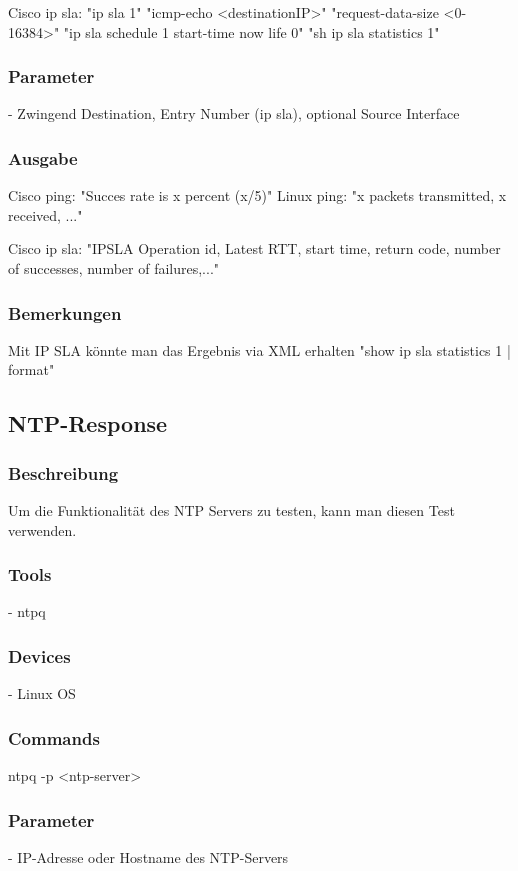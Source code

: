 \documentclass[a4,12pt]{scrartcl}
\begin{document}
Cisco ip sla: 	"ip sla 1"
			 	"icmp-echo <destinationIP>"
			  	"request-data-size <0-16384>"
			  	"ip sla schedule 1 start-time now life 0"
			  	"sh ip sla statistics 1"

\subsubsection{Parameter}
- Zwingend Destination, Entry Number (ip sla), optional Source Interface
\subsubsection{Ausgabe}
Cisco ping: "Succes rate is x percent (x/5)"
Linux ping: "x packets transmitted, x received, ..."

Cisco ip sla: "IPSLA Operation id, Latest RTT, start time, return code, number of successes, number of failures,..."

\subsubsection{Bemerkungen}
Mit IP SLA könnte man das Ergebnis via XML erhalten
"show ip sla statistics 1 | format"


\subsection{NTP-Response}
\subsubsection{Beschreibung}
Um die Funktionalität des NTP Servers zu testen, kann man diesen Test verwenden.
\subsubsection{Tools}
- ntpq
\subsubsection{Devices}
- Linux OS
\subsubsection{Commands}
ntpq -p <ntp-server>
\subsubsection{Parameter}
- IP-Adresse oder Hostname des NTP-Servers
\end{document}
